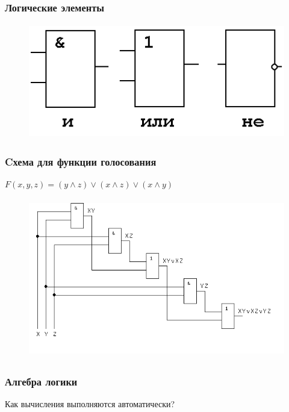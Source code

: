 \begin{frame}
\frametitle{Логические элементы	}

\begin{figure}[htbp] \begin{center}
\includegraphics[height=5cm]{images/logic}

\end{center} \end{figure}


\end{frame}
\begin{frame}
\frametitle{Cхема для функции голосования	}$
F(x,y,z) = (y\wedge z)\vee (x\wedge z)\vee ( x\wedge y)$\\
\begin{figure} \begin{center}
\includegraphics[height=7cm]{images/vote}

\end{center} \end{figure}


\end{frame}

\begin{frame}
\frametitle{Алгебра логики}

\begin{center}

\Huge
Как вычисления выполняются автоматически?

\end{center}

\end{frame}

